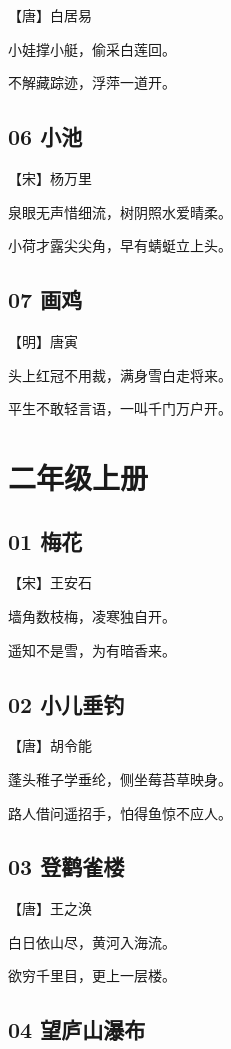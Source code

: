 \documentclass[12pt]{article}
\begin{document}
【唐】白居易


小娃撑小艇，偷采白莲回。

不解藏踪迹，浮萍一道开。

\subsection*{06 小池}

【宋】杨万里

泉眼无声惜细流，树阴照水爱晴柔。

小荷才露尖尖角，早有蜻蜓立上头。

\subsection*{07 画鸡}

【明】唐寅

头上红冠不用裁，满身雪白走将来。

平生不敢轻言语，一叫千门万户开。

\newpage

\section*{二年级上册}

\subsection*{01 梅花}

【宋】王安石

墙角数枝梅，凌寒独自开。

遥知不是雪，为有暗香来。

\subsection*{02 小儿垂钓}

【唐】胡令能

蓬头稚子学垂纶，侧坐莓苔草映身。

路人借问遥招手，怕得鱼惊不应人。

\subsection*{03 登鹳雀楼}

【唐】王之涣

白日依山尽，黄河入海流。

欲穷千里目，更上一层楼。

\subsection*{04 望庐山瀑布}
\end{document}
